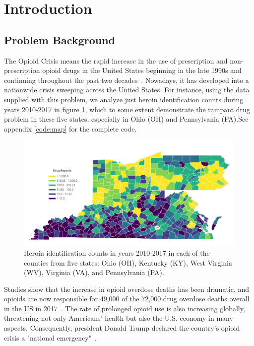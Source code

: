 \documentclass{mcmthesis}
\begin{document}
\maketitle

\tableofcontents

\newpage

\section{Introduction}	
\subsection{Problem Background}
The Opioid Crisis means the rapid increase in the use of prescription and non-prescription opioid drugs in the United States beginning in the late 1990s and continuing throughout the past two decades~\cite{op}. Nowadays, it has developed into a nationwide crisis sweeping across the United States. For instance, using the data supplied with this problem, we analyze just heroin identification counts during years 2010-2017 in figure \ref{situation}, which to some extent demonstrate the rampant drug problem in these five states, especially in Ohio (OH) and Pennsylvania (PA).See appendix \ref{code:map} for the complete code. 

\begin{figure}[htbp]
	\centering 
	\includegraphics[width=1\linewidth]{../figure/test.png}  
	\caption{Heroin identification counts in years 2010-2017 in each of the counties from five states: Ohio (OH), Kentucky (KY), West Virginia (WV), Virginia (VA), and Pennsylvania (PA).} 
	\label{situation}  
\end{figure}

Studies show that the increase in opioid overdose deaths has been dramatic, and opioids are now responsible for 49,000 of the 72,000 drug overdose deaths overall in the US in 2017~\cite{NIH}. The rate of prolonged opioid use is also increasing globally, threatening not only Americans' health but also the U.S. economy in many aspects. Consequently, president Donald Trump declared the country's opioid crisis a "national emergency"~\cite{Trump}.
\end{document}
